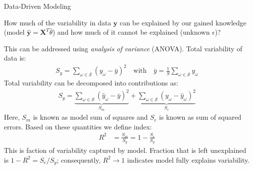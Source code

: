 \documentclass[handout,9pt]{beamer}
\begin{document}
%
\begin{frame}{Data-Driven Modeling}

\begin{block}{}
How much of the variability in data $\mathbf{y}$ can be explained by our gained knowledge (model $\hat{\mathbf{y}}=\mathbf{X}^T\hat{\theta}$) and how much of it cannot be explained (unknown $\epsilon$)?
\end{block}
This can be addressed using {\em analysis of variance} (ANOVA).  Total variability of data is:
\begin{align*}
S_{y}=\sum_{\omega\in \mathcal{S}}(y_\omega -\bar{{y}})^2\quad \textrm{with}
\quad \bar{{y}}=\frac{1}{S}\sum_{\omega \in \mathcal{S}}y_\omega 
\end{align*}
Total variability can be decomposed into contributions as:
\begin{align*}
S_{y}=\underbrace{\sum_{\omega\in \mathcal{S}}(\hat{y}_\omega -\bar{y})^2}_{S_m}+\underbrace{\sum_{\omega\in \mathcal{S}}(y_\omega -\hat{y}_\omega)^2}_{S_e}
\end{align*}
Here, $S_m$ is known as model sum of squares and $S_e$ is known as sum of squared errors.  Based on these quantities we define index: 
\begin{align*}
R^2&=\frac{S_m}{S_y}=1-\frac{S_e}{S_y}
\end{align*}
This is faction of variability captured by model. Fraction that is left unexplained is $1-R^2={S_e}/{S_y}$; consequently, $R^2\to 1$ indicates model fully explains variability. 
\end{frame}
\end{document}
